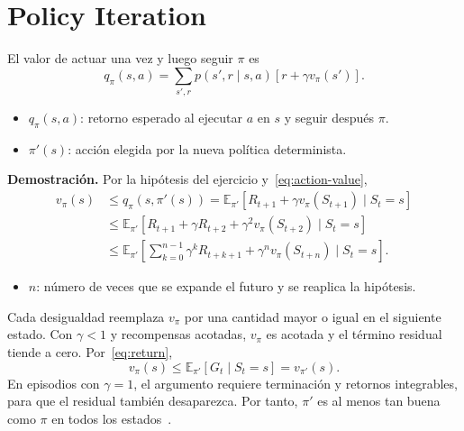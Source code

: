 \section{Policy Iteration}
El valor de actuar una vez y luego seguir $\pi$ es
\begin{equation}\label{eq:action-value}
    q_\pi(s,a)=\sum_{s',r}p(s',r\mid s,a)[r+\gamma v_\pi(s')].
\end{equation}
\begin{itemize}
    \item $q_\pi(s,a)$: retorno esperado al ejecutar $a$ en $s$ y seguir después $\pi$.
    \item $\pi'(s)$: acción elegida por la nueva política determinista.
\end{itemize}

\textbf{Demostración.} Por la hipótesis del ejercicio y~\eqref{eq:action-value},
\begin{equation}\label{eq:improvement-chain}
\begin{aligned}
    v_\pi(s)&\leq q_\pi(s,\pi'(s))
      =\mathbb{E}_{\pi'}[R_{t+1}+\gamma v_\pi(S_{t+1})\mid S_t=s]\\
    &\leq\mathbb{E}_{\pi'}[R_{t+1}+\gamma R_{t+2}
                   +\gamma^2v_\pi(S_{t+2})\mid S_t=s]\\
    &\leq\mathbb{E}_{\pi'}\left[
        \sum_{k=0}^{n-1}\gamma^kR_{t+k+1}
        +\gamma^nv_\pi(S_{t+n})\mid S_t=s\right].
\end{aligned}
\end{equation}
\begin{itemize}
    \item $n$: número de veces que se expande el futuro y se reaplica la hipótesis.
\end{itemize}
Cada desigualdad reemplaza $v_\pi$ por una cantidad mayor o igual en el siguiente estado. Con $\gamma<1$ y recompensas acotadas, $v_\pi$ es acotada y el término residual tiende a cero. Por~\eqref{eq:return},
\begin{equation}\label{eq:policy-improvement}
    v_\pi(s)\leq\mathbb{E}_{\pi'}[G_t\mid S_t=s]=v_{\pi'}(s).
\end{equation}
En episodios con $\gamma=1$, el argumento requiere terminación y retornos integrables, para que el residual también desaparezca. Por tanto, $\pi'$ es al menos tan buena como $\pi$ en todos los estados~\cite[seccs.~4.2--4.3]{sutton}.

